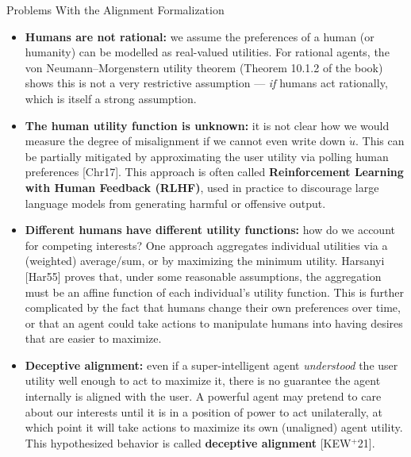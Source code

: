 \documentclass[aspectratio=169,10pt]{beamer}
\begin{document}
\begin{frame}[allowframebreaks]{Problems With the Alignment Formalization}
  \begin{itemize}
    \item \textbf{Humans are not rational:} we assume the preferences of a
      human (or humanity) can be modelled as real-valued utilities. For
      rational agents, the von Neumann--Morgenstern utility theorem
      (Theorem 10.1.2 of the book) shows this is not a very restrictive
      assumption --- \emph{if} humans act rationally, which is itself a
      strong assumption.
    \item \textbf{The human utility function is unknown:} it is not clear
      how we would measure the degree of misalignment if we cannot even
      write down $\dot u$. This can be partially mitigated by
      approximating the user utility via polling human preferences
      [Chr17]. This approach is often called \textbf{Reinforcement
      Learning with Human Feedback (RLHF)}, used in practice to discourage
      large language models from generating harmful or offensive output.
    \item \textbf{Different humans have different utility functions:} how
      do we account for competing interests? One approach aggregates
      individual utilities via a (weighted) average/sum, or by maximizing
      the minimum utility. Harsanyi [Har55] proves that, under some
      reasonable assumptions, the aggregation must be an affine function
      of each individual's utility function. This is further complicated
      by the fact that humans change their own preferences over time, or
      that an agent could take actions to manipulate humans into having
      desires that are easier to maximize.

    \framebreak

    \item \textbf{Deceptive alignment:} even if a super-intelligent agent
      \emph{understood} the user utility well enough to act to maximize
      it, there is no guarantee the agent internally is aligned with the
      user. A powerful agent may pretend to care about our interests
      until it is in a position of power to act unilaterally, at which
      point it will take actions to maximize its own (unaligned) agent
      utility. This hypothesized behavior is called \textbf{deceptive
      alignment} [KEW$^+$21].
  \end{itemize}
\end{frame}
\end{document}
